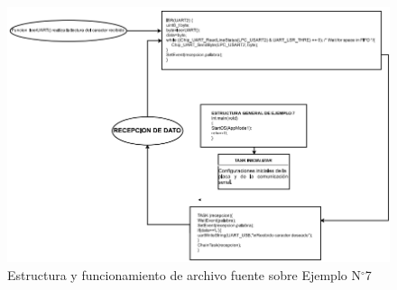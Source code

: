 \documentclass[12pt,letterpaper]{article}
\begin{document}
\begin{figure}[H]
\centering
\includegraphics[width=15 cm]{figuras/f38.png}
\caption{Estructura y funcionamiento de archivo fuente sobre Ejemplo N$^{\circ}$7}
\label{Fig45}
\end{figure}
\end{document}

